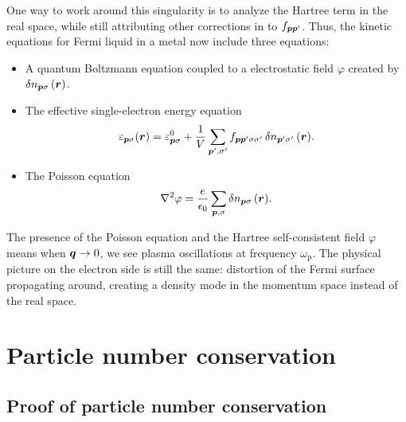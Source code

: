 \documentclass[hyperref, a4paper]{article}
\begin{document}
One way to work around this singularity 
is to analyze the Hartree term in the real space, 
while still attributing other corrections in 
to $f_{\vb*{p} \vb*{p}'}$.
Thus, the kinetic equations for Fermi liquid in a metal 
now include three equations: 
\begin{itemize}
    \item A quantum Boltzmann equation coupled to a electrostatic field $\varphi$
    created by $\var{n}_{\vb*{p} \sigma}(\vb*{r})$.
    \item The effective single-electron energy equation 
    \begin{equation}
        \varepsilon_{\vb*{p} \sigma}(\vb*{r}) = \varepsilon^0_{\vb*{p} \sigma} 
        + \frac{1}{V} \sum_{\vb*{p}', \sigma'} 
        f_{\vb*{p} \vb*{p}' \sigma \sigma'} \var{n}_{\vb*{p}' \sigma'}(\vb*{r}).
    \end{equation}
    \item The Poisson equation 
    \begin{equation}
        \laplacian \varphi = \frac{e}{\epsilon_0} \sum_{\vb*{p}, \sigma} \var{n}_{\vb*{p} \sigma}(\vb*{r}).
    \end{equation}
\end{itemize}
The presence of the Poisson equation 
and the Hartree self-consistent field $\varphi$
means when $\vb*{q} \to 0$, 
we see plasma oscillations at frequency $\omega_{\text{p}}$.
The physical picture on the electron side 
is still the same: 
distortion of the Fermi surface propagating around,
creating a density mode in the momentum space instead of the real space.

\section{Particle number conservation}

\subsection{Proof of particle number conservation}

\printbibliography
\end{document}
